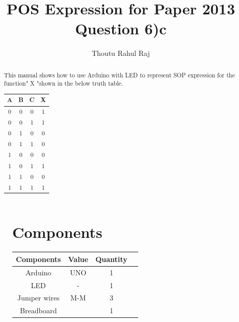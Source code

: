 \documentclass{article}
\title{POS Expression for Paper 2013 Question 6)c}
\author{Thoutu Rahul Raj}
\begin{document}
\begin{figure}
\maketitle
\begin{multicols}{2}
\tableofcontents
\vspace{10mm}

\begin{abstract}
 This manual shows how to use Arduino with LED to represent SOP expression for the function" X "shown in the  below truth table. \\
 
 \vspace{3mm}
 \centering
 
 \begin{tabular}{ |c |c |c |c |}
 \hline
 A  &  B  &  C  &  X\\
 \hline
 0  &  0  &  0  &  1\\
 \hline
 0  &  0  &  1  &  1\\
 \hline
 0  &  1  &  0  &  0\\
 \hline
 0  &  1  &  1  &  0\\
 \hline
 1  &  0  &  0  &  0\\
 \hline
 1  &  0  &  1  &  1\\
 \hline
 1  &  1  &  0  &  0\\
 \hline
 1  &  1  &  1  &  1\\
 \hline
 \end{tabular}
 \end{abstract}
 
\section{Components}

    \centering
    \begin{tabular}{ |c |c |c |c |}
\hline
\textbf{Components} & \textbf{Value} & \textbf{Quantity} \\
\hline
 Arduino & UNO & 1 \\  
 LED & - & 1 \\
 Jumper wires&M-M &3\\
 Breadboard& &1\\
 \hline
 \end{tabular}
 \vspace{3mm}
 

\end{multicols}
\end{figure}
\end{document}
